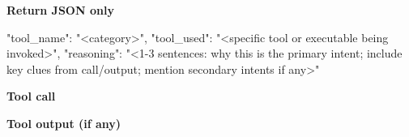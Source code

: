 \begin{promptbox}
\medskip
\textbf{Return JSON only}
\begin{schemabox}
{
  "tool_name": "<category>",
  "tool_used": "<specific tool or executable being invoked>",
  "reasoning": "<1-3 sentences: why this is the primary intent; include key clues from call/output; mention secondary intents if any>"
}
\end{schemabox}

\medskip
\textbf{Tool call}

\medskip
\textbf{Tool output (if any)}
\end{promptbox}

